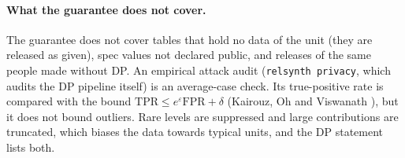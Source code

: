 \paragraph{What the guarantee does not cover.} The guarantee does not cover tables that hold no data of the unit (they are released as given), spec values not declared public, and releases of the same people made without DP. An empirical attack audit (\texttt{relsynth privacy}, which audits the DP pipeline itself) is an average-case check. Its true-positive rate is compared with the bound $\mathrm{TPR}\le e^\varepsilon\mathrm{FPR}+\delta$ (Kairouz, Oh and Viswanath \cite{kairouz2015}), but it does not bound outliers. Rare levels are suppressed and large contributions are truncated, which biases the data towards typical units, and the DP statement lists both.

\setcounter{proposition}{\value{savedpropdp}}
